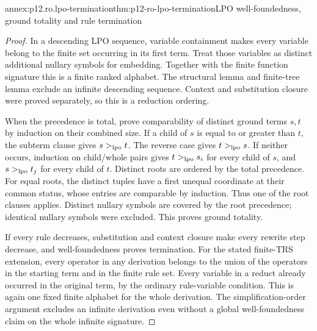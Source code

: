 \begin{annexitem}{annex:p12.ro.lpo-termination}{thm:p12-ro-lpo-termination}{LPO well-foundedness, ground totality and rule termination}
\begin{proof}
In a descending LPO sequence, variable containment makes every
variable belong to the finite set occurring in its first term. Treat
those variables as distinct additional nullary symbols for embedding.
Together with the finite function signature this is a finite ranked
alphabet. The structural lemma and finite-tree lemma exclude an
infinite descending sequence. Context and substitution closure were
proved separately, so this is a reduction ordering.

When the precedence is total, prove comparability of distinct ground
terms \(s,t\) by induction on their combined size. If a child of
\(s\) is equal to or greater than \(t\), the subterm clause gives
\(s>_{\rm lpo}t\). The reverse case gives \(t>_{\rm lpo}s\).
If neither occurs, induction on child/whole pairs gives
\(t>_{\rm lpo}s_i\) for every child of \(s\), and
\(s>_{\rm lpo}t_j\) for every child of \(t\). Distinct roots
are ordered by the total precedence. For equal roots, the distinct
tuples have a first unequal coordinate at their common status, whose
entries are comparable by induction. Thus one of the root clauses
applies. Distinct nullary symbols are covered by the root precedence;
identical nullary symbols were excluded. This proves ground totality.

If every rule decreases, substitution and context closure make every
rewrite step decrease, and well-foundedness proves termination.
For the stated finite-TRS extension, every operator in any derivation
belongs to the union of the operators in the starting term and in
the finite rule set. Every variable in a reduct already occurred in
the original term, by the ordinary rule-variable condition. This is
again one fixed finite alphabet for the whole derivation. The
simplification-order argument excludes an infinite derivation even
without a global well-foundedness claim on the whole infinite signature.
\end{proof}
\end{annexitem}

